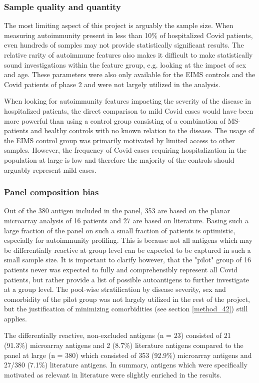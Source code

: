 \documentclass{article}
\begin{document}
\subsubsection{Sample quality and quantity}\label{disc_sample}
The most limiting aspect of this project is arguably the sample size. When measuring autoimmunity present in less than 10\% of hospitalized Covid patients, even hundreds of samples may not provide statistically significant results. The relative rarity of autoimmune features also makes it difficult to make statistically sound investigations within the feature group, e.g. looking at the impact of sex and age. These parameters were also only available for the EIMS controls and the Covid patients of phase 2 and were not largely utilized in the analysis.

When looking for autoimmunity features impacting the severity of the disease in hospitalized patients, the direct comparison to mild Covid cases would have been more powerful than using a control group consisting of a combination of MS-patients and healthy controls with no known relation to the disease. The usage of the EIMS control group was primarily motivated by limited access to other samples. However, the frequency of Covid cases requiring hospitalization in the population at large is low and therefore the majority of the controls should arguably represent mild cases.

\subsubsection{Panel composition bias}
Out of the 380 antigen included in the panel, 353 are based on the planar microarray analysis of 16 patients and 27 are based on literature. Basing such a large fraction of the panel on such a small fraction of patients is optimistic, especially for autoimmunity profiling. This is because not all antigens which may be differentially reactive at group level can be expected to be captured in such a small sample size. It is important to clarify however, that the "pilot" group of 16 patients never was expected to fully and comprehensibly represent all Covid patients, but rather provide a list of possible autoantigens to further investigate at a group level. The pool-wise stratification by disease severity, sex and comorbidity of the pilot group was not largely utilized in the rest of the project, but the justification of minimizing comorbidities (see section \ref{method_42}) still applies.

The differentially reactive, non-excluded antigens (n = 23) consisted of 21 (91.3\%) microarray antigens and 2 (8.7\%) literature antigens compared to the panel at large (n = 380) which consisted of 353 (92.9\%) microarray antigens and 27/380 (7.1\%) literature antigens. In summary, antigens which were specifically motivated as relevant in literature were slightly enriched in the results.
\end{document}
